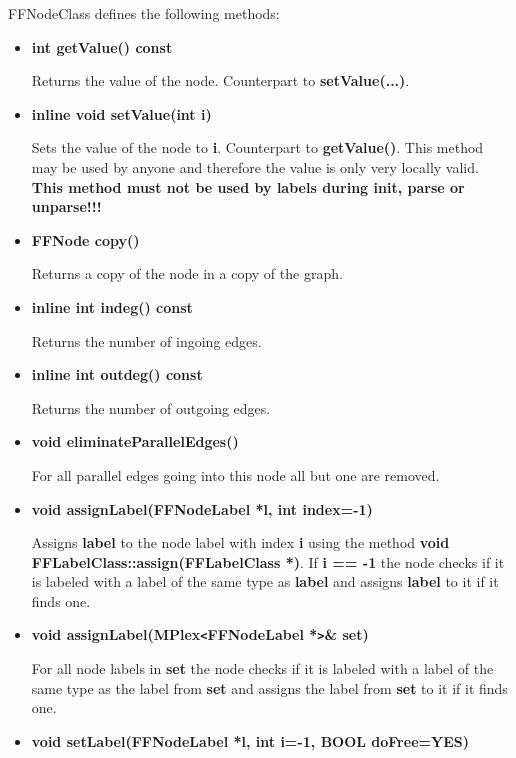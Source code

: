 FFNodeClass defines the following methods:

\begin{itemize}

\item{\bf int getValue() const}

Returns the value of the node. Counterpart to {\bf setValue(...)}.

\item{\bf inline void setValue(int i)}
  
  Sets the value of the node to {\bf i}. Counterpart to {\bf
    getValue()}.  This method may be used by anyone and therefore
  the value is only very locally valid. {\bf This method must not
    be used by labels during init, parse or unparse!!!}

\item{\bf FFNode copy()}

Returns a copy of the node in a copy of the graph.
  
\item{\bf inline int indeg() const}

Returns the number of ingoing edges.

\item{\bf inline int outdeg() const}

Returns the number of outgoing edges.

\item{\bf void eliminateParallelEdges()}

For all parallel edges going into this node all but one are removed.

\item{\bf void assignLabel(FFNodeLabel *l, int index=-1)}

Assigns {\bf label} to the node label with index {\bf i} using
the method {\bf void FFLabelClass::assign(FFLabelClass *)}.
If {\bf i == -1} the node checks if it is labeled with a label
of the same type as {\bf label} and assigns {\bf label} to it
if it finds one.

\item{\bf void assignLabel(MPlex\verb|<|FFNodeLabel *\verb|>|\&
    set)}
  
  For all node labels in {\bf set} the node checks if it is
  labeled with a label of the same type as the label from {\bf
    set} and assigns the label from {\bf set} to it if it finds
  one.

\item{\bf void setLabel(FFNodeLabel *l, int i=-1, BOOL doFree=YES)}
  

\end{itemize}
